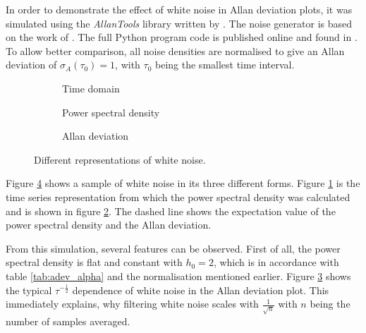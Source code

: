 In order to demonstrate the effect of white noise in Allan deviation plots, it was simulated using the \textit{AllanTools} library written by \citeauthor{allantools} \cite{allantools}. The noise generator is based on the work of \citeauthor{noise_generation} \cite{noise_generation}. The full Python program code is published online \cite{supplemental_material} and found in . To allow better comparison, all noise densities are normalised to give an Allan deviation of $\sigma_A(\tau_0)=1$, with $\tau_0$ being the smallest time interval.
\begin{figure}[ht]
    \centering
    \begin{subfigure}{0.32\linewidth}
        \centering
        \scalebox{0.75}{%
        } %
        \caption{Time domain}
        \label{fig:white_noise_time}
    \end{subfigure}
    \hfill
    \begin{subfigure}{0.32\linewidth}
        \centering
        \scalebox{0.75}{%
        } %
        \caption{Power spectral density}
        \label{fig:white_noise_psd}
    \end{subfigure}
    \hfill
    \begin{subfigure}{0.32\linewidth}
        \centering
        \scalebox{0.75}{%
        } %
        \caption{Allan deviation}
        \label{fig:white_noise_adev}
    \end{subfigure}
    \caption{Different representations of white noise.}
    \label{fig:white_noise_simulated}
\end{figure}

Figure \ref{fig:white_noise_simulated} shows a sample of white noise in its three different forms. Figure \ref{fig:white_noise_time} is the time series representation from which the power spectral density was calculated and is shown in figure \ref{fig:white_noise_psd}. The dashed line shows the expectation value of the power spectral density and the Allan deviation.

From this simulation, several features can be observed. First of all, the power spectral density is flat and constant with $h_0 = 2$, which is in accordance with table \ref{tab:adev_alpha} and the normalisation mentioned earlier. Figure \ref{fig:white_noise_adev} shows the typical $\tau^{-\frac 1 2}$ dependence of white noise in the Allan deviation plot. This immediately explains, why filtering white noise scales with $\frac{1}{\sqrt{n}}$ with $n$ being the number of samples averaged.

